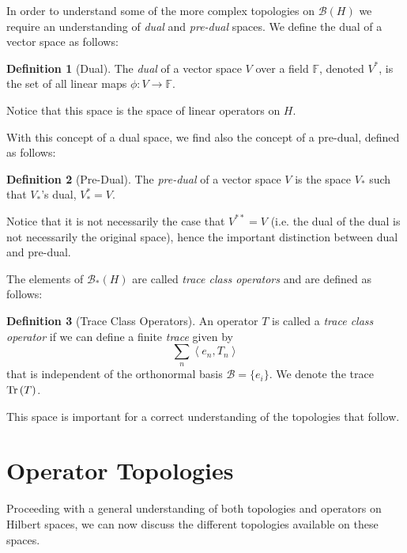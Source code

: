 \documentclass{article}
\theoremstyle{plain}
\theoremstyle{definition}
\newtheorem{definition}{Definition}
\newcommand{\inner}[2]{\left\langle #1, #2 \right\rangle}
\newcommand{\tr}[1]{\textnormal{Tr}\left(#1\right)}
\newcommand{\BH}{\cal{B}(H)}
\newcommand{\PDBH}{\cal{B}_*(H)}
\newcommand{\bb}[1]{\mathbb{#1}}
\renewcommand{\cal}[1]{\mathcal{#1}}
\begin{document}
                In order to understand some of the more complex topologies on $\BH$ we require an understanding of \textit{dual} and \textit{pre-dual} spaces.
                We define the dual of a vector space as follows:
                \begin{definition}[Dual] \label{def:dual}
                        The \textit{dual} of a vector space $V$ over a field $\bb{F}$, denoted $V^*$, is the set of all linear maps $\phi : V \to \bb{F}$.
                \end{definition}
                Notice that this space is the space of linear operators on $H$.

                With this concept of a dual space, we find also the concept of a pre-dual, defined as follows:
                \begin{definition}[Pre-Dual] \label{def:predual}
                        The \textit{pre-dual} of a vector space $V$ is the space $V_*$ such that $V_*$'s dual, $V_*^* = V$.
                \end{definition}
                Notice that it is not necessarily the case that $V^{**} = V$ (i.e. the dual of the dual is not necessarily the original space), hence the important distinction between dual and pre-dual. 
                
                The elements of $\PDBH$ are called \textit{trace class operators} and are defined as follows:
                \begin{definition}[Trace Class Operators] \label{def:TCO}
                        An operator $T$ is called a \textit{trace class operator} if we can define a finite \textit{trace} given by
                                $$\sum_n \inner{e_n}{T_n}$$
                        that is independent of the orthonormal basis $\cal{B} = \{e_i\}$.
                        We denote the trace $\tr{T}$.
                \end{definition}
                This space is important for a correct understanding of the topologies that follow.


\section{Operator Topologies} \label{sec:operator topologies}

        Proceeding with a general understanding of both topologies and operators on Hilbert spaces, we can now discuss the different topologies available on these spaces.
        
\end{document}
